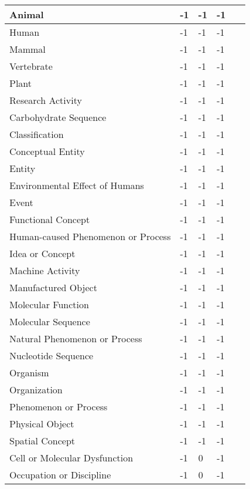 \documentclass[10.7pt,]{article}
\begin{document}
\begin{longtable}{|l|p{0.3cm}|p{0.3cm}|p{0.3cm}|p{7.9cm}|}
        Animal & -1 & -1 & -1 & ~ \\ \hline
        Human & -1 & -1 & -1 & ~ \\ \hline
        Mammal & -1 & -1 & -1 & ~ \\ \hline
        Vertebrate & -1 & -1 & -1 & ~ \\ \hline
        Plant & -1 & -1 & -1 & ~ \\ \hline
        Research Activity & -1 & -1 & -1 & ~ \\ \hline
        Carbohydrate Sequence & -1 & -1 & -1 & ~ \\ \hline
        Classification & -1 & -1 & -1 & ~ \\ \hline
        Conceptual Entity & -1 & -1 & -1 & ~ \\ \hline
        Entity & -1 & -1 & -1 & ~ \\ \hline
        Environmental Effect of Humans & -1 & -1 & -1 & ~ \\ \hline
        Event & -1 & -1 & -1 & ~ \\ \hline
        Functional Concept & -1 & -1 & -1 & ~ \\ \hline
        Human-caused Phenomenon or Process & -1 & -1 & -1 & ~ \\ \hline
        Idea or Concept & -1 & -1 & -1 & ~ \\ \hline
        Machine Activity & -1 & -1 & -1 & ~ \\ \hline
        Manufactured Object & -1 & -1 & -1 & ~ \\ \hline
        Molecular Function & -1 & -1 & -1 & ~ \\ \hline
        Molecular Sequence & -1 & -1 & -1 & ~ \\ \hline
        Natural Phenomenon or Process & -1 & -1 & -1 & ~ \\ \hline
        Nucleotide Sequence & -1 & -1 & -1 & ~ \\ \hline
        Organism & -1 & -1 & -1 & ~ \\ \hline
        Organization & -1 & -1 & -1 & ~ \\ \hline
        Phenomenon or Process & -1 & -1 & -1 & ~ \\ \hline
        Physical Object & -1 & -1 & -1 & ~ \\ \hline
        Spatial Concept & -1 & -1 & -1 & ~ \\ \hline
        Cell or Molecular Dysfunction & -1 & 0 & -1 & ~ \\ \hline
        Occupation or Discipline & -1 & 0 & -1 & ~ \\ \hline

\end{longtable}
\end{document}
